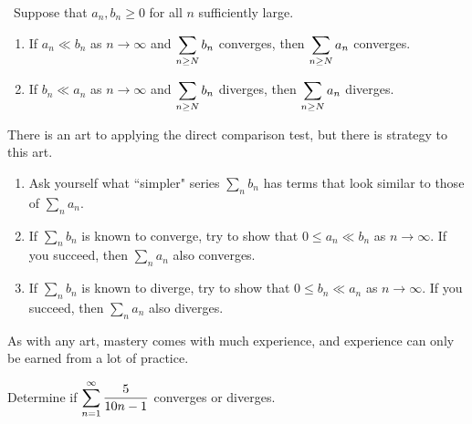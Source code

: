 \setcounter{chapter}{10}
\setcounter{section}{4}
\setcounter{theorem}{0}
\setcounter{equation}{0}


\begin{theorem}\,
Suppose that $a_n,b_n\ge 0$ for all $n$ sufficiently large.
\begin{enumerate}
\item If $a_n\ll b_n$ as $n\to\infty$ and $\displaystyle\sum_{n\ge N} b_n$ converges, then $\displaystyle\sum_{n\ge N}a_n$ converges.
\item If $b_n\ll a_n$ as $n\to\infty$ and $\displaystyle\sum_{n\ge N} b_n$ diverges, then $\displaystyle\sum_{n\ge N}a_n$ diverges.\label{direct comparison test}
\end{enumerate}
\end{theorem}
%

\begin{remark}
There is an art to applying the direct comparison test, but there is strategy to this art.
\begin{enumerate}
\item Ask yourself what ``simpler" series $\sum_n b_n$ has terms that look similar to those of $\sum_n a_n$.
\item If $\sum_n b_n$ is known to converge, try to show that $0\le a_n\ll b_n$ as $n\to\infty$.  If you succeed, then $\sum_n a_n$ also converges.
\item If $\sum_n b_n$ is known to diverge, try to show that $0\le b_n\ll a_n$ as $n\to\infty$. If you succeed, then $\sum_n a_n$ also diverges.
\end{enumerate}
As with any art, mastery comes with much experience, and experience can only be earned from a lot of practice.
\end{remark}

\newpage

\begin{example}
Determine if $\displaystyle\sum_{n=1}^\infty\frac{5}{10n-1}$ converges or diverges.
\end{example}
\ifdefined\SOLUTION
{}
\else
\fi

